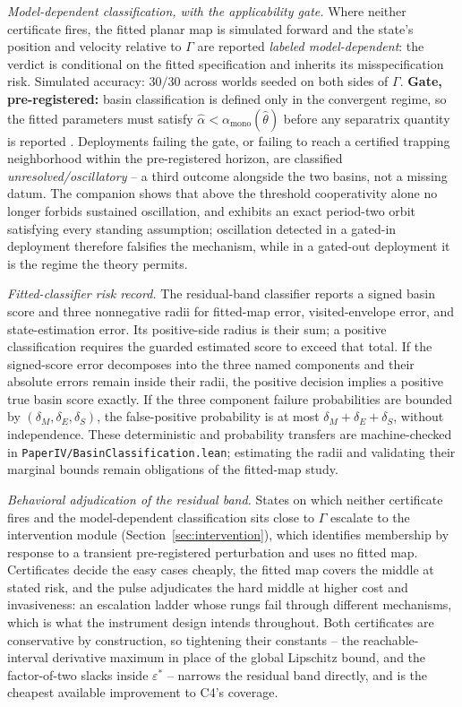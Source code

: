 \documentclass[11pt]{article}
\theoremstyle{definition}
\theoremstyle{remark}
\numberwithin{equation}{section}
\begin{document}
\emph{Model-dependent classification, with the applicability gate.} Where neither certificate fires, the fitted planar map is simulated forward and the state's position and velocity relative to $\Gamma$ are reported \emph{labeled model-dependent}: the verdict is conditional on the fitted specification and inherits its misspecification risk. Simulated accuracy: $30/30$ across worlds seeded on both sides of $\Gamma$. \textbf{Gate, pre-registered:} basin classification is defined only in the convergent regime, so the fitted parameters must satisfy $\hat\alpha < \alpha_{\mathrm{mono}}(\hat\theta)$ before any separatrix quantity is reported \citep{hofheinz2026drift}. Deployments failing the gate, or failing to reach a certified trapping neighborhood within the pre-registered horizon, are classified \emph{unresolved/oscillatory} -- a third outcome alongside the two basins, not a missing datum. The companion shows that above the threshold cooperativity alone no longer forbids sustained oscillation, and exhibits an exact period-two orbit satisfying every standing assumption; oscillation detected in a gated-in deployment therefore falsifies the mechanism, while in a gated-out deployment it is the regime the theory permits.

\emph{Fitted-classifier risk record.} The residual-band classifier reports a
signed basin score and three nonnegative radii for fitted-map error,
visited-envelope error, and state-estimation error. Its positive-side radius is
their sum; a positive classification requires the guarded estimated score to
exceed that total. If the signed-score error decomposes into the three named
components and their absolute errors remain inside their radii, the positive
decision implies a positive true basin score exactly. If the three component
failure probabilities are bounded by $(\delta_M,\delta_E,\delta_S)$, the
false-positive probability is at most
$\delta_M+\delta_E+\delta_S$, without independence. These deterministic and
probability transfers are machine-checked in
\texttt{PaperIV/BasinClassification.lean}; estimating the radii and validating
their marginal bounds remain obligations of the fitted-map study.

\emph{Behavioral adjudication of the residual band.} States on which neither certificate fires and the model-dependent classification sits close to $\Gamma$ escalate to the intervention module (Section~\ref{sec:intervention}), which identifies membership by response to a transient pre-registered perturbation and uses no fitted map. Certificates decide the easy cases cheaply, the fitted map covers the middle at stated risk, and the pulse adjudicates the hard middle at higher cost and invasiveness: an escalation ladder whose rungs fail through different mechanisms, which is what the instrument design intends throughout. Both certificates are conservative by construction, so tightening their constants -- the reachable-interval derivative maximum in place of the global Lipschitz bound, and the factor-of-two slacks inside $\varepsilon^\ast$ -- narrows the residual band directly, and is the cheapest available improvement to C4's coverage.
\end{document}
